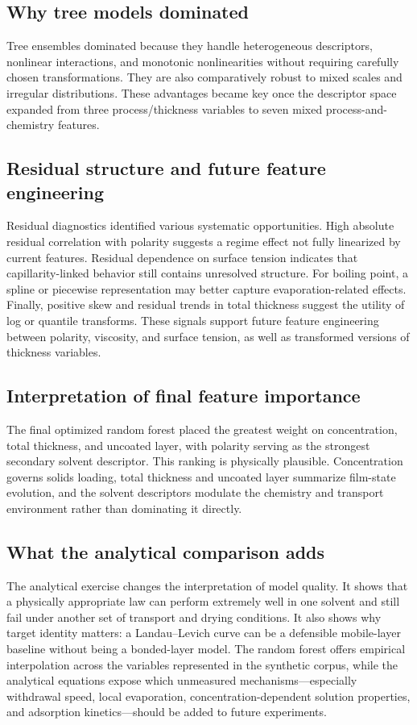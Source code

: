 \documentclass[11pt]{article}
\begin{document}
\subsection{Why tree models dominated}
Tree ensembles dominated because they handle heterogeneous descriptors, nonlinear interactions, and monotonic nonlinearities without requiring carefully chosen transformations. They are also comparatively robust to mixed scales and irregular distributions. These advantages became key once the descriptor space expanded from three process/thickness variables to seven mixed process-and-chemistry features.

\subsection{Residual structure and future feature engineering}
Residual diagnostics identified various systematic opportunities. High
absolute residual correlation with polarity suggests a regime effect not
fully linearized by current features. Residual dependence on surface tension
indicates that capillarity-linked behavior still contains unresolved
structure. For boiling point, a spline or piecewise representation may
better capture evaporation-related effects. Finally, positive skew and
residual trends in total thickness suggest the utility of log or quantile
transforms. These signals support future feature engineering between
polarity, viscosity, and surface tension, as well as transformed versions
of thickness variables.

\subsection{Interpretation of final feature importance}
The final optimized random forest placed the greatest weight on concentration, total thickness, and uncoated layer, with polarity serving as the strongest secondary solvent descriptor. This ranking is physically plausible. Concentration governs solids loading, total thickness and uncoated layer summarize film-state evolution, and the solvent descriptors modulate the chemistry and transport environment rather than dominating it directly.

\subsection{What the analytical comparison adds}
The analytical exercise changes the interpretation of model quality. It shows that a physically appropriate law can perform extremely well in one solvent and still fail under another set of transport and drying conditions. It also shows why target identity matters: a Landau--Levich curve can be a defensible mobile-layer baseline without being a bonded-layer model. The random forest offers empirical interpolation across the variables represented in the synthetic corpus, while the analytical equations expose which unmeasured mechanisms---especially withdrawal speed, local evaporation, concentration-dependent solution properties, and adsorption kinetics---should be added to future experiments.
\end{document}
